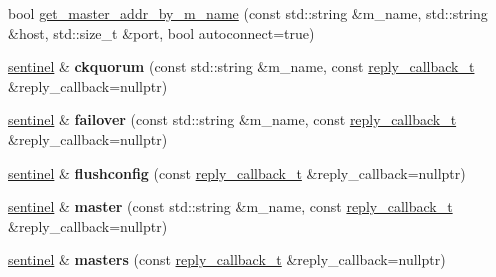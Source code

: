 \begin{DoxyCompactItemize}
\item 
bool \mbox{\hyperlink{classcpp__redis_1_1sentinel_a2886493b40b00dfafdd3b22dfe28e0c3}{get\+\_\+master\+\_\+addr\+\_\+by\+\_\+m_name}} (const std\+::string \&m_name, std\+::string \&host, std\+::size\+\_\+t \&port, bool autoconnect=true)
\item 
\mbox{\label{classcpp__redis_1_1sentinel_aaed03955e468d9f7c3df37376ecafc3a}} 
\mbox{\hyperlink{classcpp__redis_1_1sentinel}{sentinel}} \& {\bfseries ckquorum} (const std\+::string \&m_name, const \mbox{\hyperlink{classcpp__redis_1_1sentinel_ae1a150ff8787208c47414397a061c9a7}{reply\+\_\+callback\+\_\+t}} \&reply\+\_\+callback=nullptr)
\item 
\mbox{\label{classcpp__redis_1_1sentinel_abd4ee07b5a17ca15b74d25702687e53a}} 
\mbox{\hyperlink{classcpp__redis_1_1sentinel}{sentinel}} \& {\bfseries failover} (const std\+::string \&m_name, const \mbox{\hyperlink{classcpp__redis_1_1sentinel_ae1a150ff8787208c47414397a061c9a7}{reply\+\_\+callback\+\_\+t}} \&reply\+\_\+callback=nullptr)
\item 
\mbox{\label{classcpp__redis_1_1sentinel_ab3c3a6822ebd512217280b0ca1a0f29f}} 
\mbox{\hyperlink{classcpp__redis_1_1sentinel}{sentinel}} \& {\bfseries flushconfig} (const \mbox{\hyperlink{classcpp__redis_1_1sentinel_ae1a150ff8787208c47414397a061c9a7}{reply\+\_\+callback\+\_\+t}} \&reply\+\_\+callback=nullptr)
\item 
\mbox{\label{classcpp__redis_1_1sentinel_a3d08fbc6ae90b93613f0b3c56a6bf1fe}} 
\mbox{\hyperlink{classcpp__redis_1_1sentinel}{sentinel}} \& {\bfseries master} (const std\+::string \&m_name, const \mbox{\hyperlink{classcpp__redis_1_1sentinel_ae1a150ff8787208c47414397a061c9a7}{reply\+\_\+callback\+\_\+t}} \&reply\+\_\+callback=nullptr)
\item 
\mbox{\label{classcpp__redis_1_1sentinel_aed4cacf43432630eb2934ce8b8dec104}} 
\mbox{\hyperlink{classcpp__redis_1_1sentinel}{sentinel}} \& {\bfseries masters} (const \mbox{\hyperlink{classcpp__redis_1_1sentinel_ae1a150ff8787208c47414397a061c9a7}{reply\+\_\+callback\+\_\+t}} \&reply\+\_\+callback=nullptr)
\item 
\mbox{\label{classcpp__redis_1_1sentinel_ad4ae72b60a5a03977cda0d3e1f4ee48d}} 

\end{DoxyCompactItemize}
